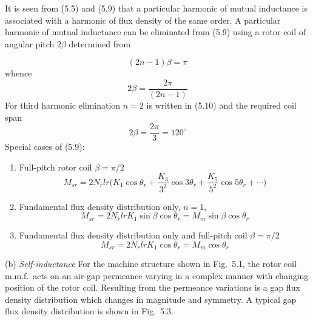 \documentclass[a4paper,numbers=noenddot,12pt]{scrbook}
\begin{document}
        It is seen from (5.5) and (5.9) that a particular harmonic of mutual inductance is associated with a harmonic of flux density of the same order. A particular harmonic of mutual inductance can be eliminated from (5.9) using a rotor coil of angular pitch $2\beta$ determined from

        \begin{equation*}
            (2n - 1)\beta = \pi
        \end{equation*}
        whence
        \begin{equation}
            2\beta=\frac{2\pi}{(2n-1)}
        \end{equation}
        For third harmonic elimination $n = 2$ is written in (5.10) and the required coil span
        \begin{equation*}
            2\beta = \frac{2\pi}{3} = 120^{\circ}
        \end{equation*}
        Special cases of (5.9):
        \begin{enumerate}
            \item Full-pitch rotor coil $\beta = \pi/2$
                \begin{equation}
                    M_{sr} = 2 N_r l r \bigg( K_1 \cos\theta_r + \frac{K_3}{3^2} \cos 3 \theta_r + \frac{K_5}{5^2} \cos 5 \theta_r + \cdots \bigg)
                \end{equation}
            \item
                Fundamental flux density distribution only, $n=1$,
                \begin{equation}
                    M_{sr}=2N_r l r K_1 \sin\beta\cos\theta_r = M_m \sin \beta \cos \theta_r
                \end{equation}
            \item
                Fundamental flux density distribution only and full-pitch coil $\beta=\pi/2$
                \begin{equation}
                    M_{sr} = 2 N_r l r K_1 \cos\theta_r = M_m \cos\theta_r
                \end{equation}
        \end{enumerate}

        \noindent
        (b) \textit{Self-inductance} For the machine structure shown in Fig.\ 5.1, the rotor coil m.m.f.\ acts on an air-gap permeance varying in a complex manner with changing position of the rotor coil. Resulting from the permeance variations is a gap flux density distribution which changes in magnitude and symmetry. A typical gap flux density distribution is shown in Fig.\ 5.3. \par
\end{document}
